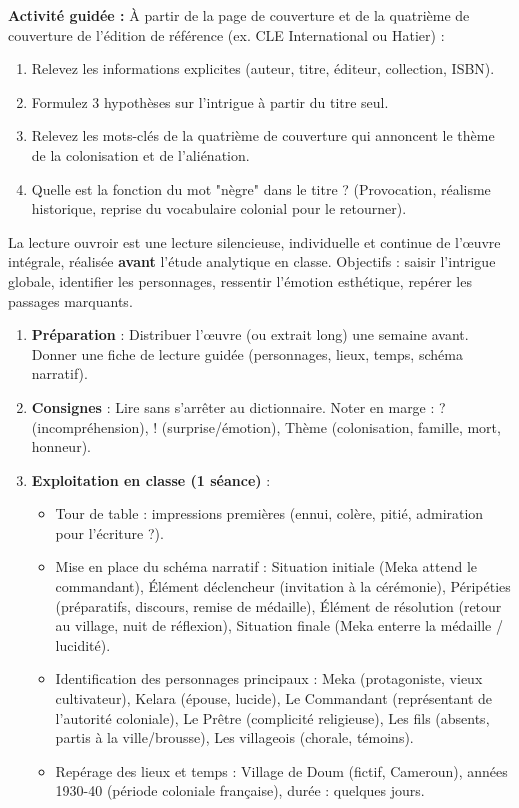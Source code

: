 \documentclass[11pt]{article}
\newcommand{\cle}[1]{{\popxbold\color{popdark}#1}}
\begin{document}
\begin{exemplebox}
\textbf{Activité guidée :} À partir de la page de couverture et de la quatrième de couverture de l'édition de référence (ex. CLE International ou Hatier) :
\begin{enumerate}
\item Relevez les informations explicites (auteur, titre, éditeur, collection, ISBN).
\item Formulez 3 hypothèses sur l'intrigue à partir du titre seul.
\item Relevez les mots-clés de la quatrième de couverture qui annoncent le thème de la \cle{colonisation} et de l'\cle{aliénation}.
\item Quelle est la fonction du mot "nègre" dans le titre ? (Provocation, réalisme historique, reprise du vocabulaire colonial pour le retourner).
\end{enumerate}
\end{exemplebox}

\begin{methode}
La lecture ouvroir est une lecture silencieuse, individuelle et continue de l'œuvre intégrale, réalisée \textbf{avant} l'étude analytique en classe. Objectifs : saisir l'intrigue globale, identifier les personnages, ressentir l'émotion esthétique, repérer les passages marquants.
\begin{enumerate}
\item \textbf{Préparation} : Distribuer l'œuvre (ou extrait long) une semaine avant. Donner une fiche de lecture guidée (personnages, lieux, temps, schéma narratif).
\item \textbf{Consignes} : Lire sans s'arrêter au dictionnaire. Noter en marge : \cle{?} (incompréhension), \cle{!} (surprise/émotion), \cle{Thème} (colonisation, famille, mort, honneur).
\item \textbf{Exploitation en classe (1 séance)} :
\begin{itemize}
\item Tour de table : impressions premières (ennui, colère, pitié, admiration pour l'écriture ?).
\item Mise en place du \cle{schéma narratif} : Situation initiale (Meka attend le commandant), Élément déclencheur (invitation à la cérémonie), Péripéties (préparatifs, discours, remise de médaille), Élément de résolution (retour au village, nuit de réflexion), Situation finale (Meka enterre la médaille / lucidité).
\item Identification des \cle{personnages principaux} : Meka (protagoniste, vieux cultivateur), Kelara (épouse, lucide), Le Commandant (représentant de l'autorité coloniale), Le Prêtre (complicité religieuse), Les fils (absents, partis à la ville/brousse), Les villageois (chorale, témoins).
\item Repérage des \cle{lieux et temps} : Village de Doum (fictif, Cameroun), années 1930-40 (période coloniale française), durée : quelques jours.
\end{itemize}
\end{enumerate}
\end{methode}
\end{document}
